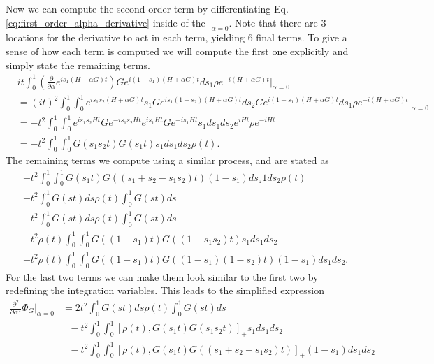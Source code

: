 \documentclass{article}
\newcommand{\parens}[1]{\left( #1 \right)}
\newcommand{\brackets}[1]{\left[ #1 \right]}
\begin{document}
Now we can compute the second order term by differentiating Eq. \eqref{eq:first_order_alpha_derivative} inside of the $\big|_{\alpha = 0}$. Note that there are 3 locations for the derivative to act in each term, yielding 6 final terms. To give a sense of how each term is computed we will compute the first one explicitly and simply state the remaining terms.
\begin{align}
    &i t\int_0^1 \parens{\frac{\partial}{\partial \alpha} e^{i s_1 (H+ \alpha G)t}} G e^{i(1-s_1)(H+\alpha G)t} ds_1 \rho e^{-i (H+\alpha G)t} \bigg|_{\alpha=0} \\
    &= (it)^2 \int_0^1 \int_0^1 e^{i s_1 s_2 (H+\alpha G)t} s_1 G e^{i s_1 (1-s_2) (H+\alpha G)t} ds_2 G e^{i(1-s_1) (H+\alpha G)t} ds_1 \rho e^{-i(H+\alpha G) t} \bigg|_{\alpha=0} \\
    &= -t^2 \int_0^1 \int_0^1 e^{i s_1 s_2 H t} G e^{-i s_1 s_2 H t} e^{i s_1 H t} G e^{-i s_1 H t} s_1 ds_1 ds_2 e^{i H t} \rho e^{-i H t} \\
    &= -t^2 \int_0^1 \int_0^1 G(s_1 s_2 t) G(s_1 t) s_1 ds_1 ds_2 \rho(t).
\end{align}
The remaining terms we compute using a similar process, and are stated as
\begin{align}
    & -t^2 \int_0^1 \int_0^1 G(s_1 t) G((s_1 + s_2 - s_1 s_2) t) (1-s_1) ds_z1 ds_2 \rho (t) \\
    & +t^2 \int_0^1 G(st) ds \rho(t) \int_0^1 G(st) ds \\
    & +t^2 \int_0^1 G(st) ds \rho(t) \int_0^1 G(st) ds \\
    & -t^2 \rho(t) \int_0^1 \int_0^1 G((1-s_1)t) G((1-s_1 s_2) t) s_1 ds_1 ds_2 \\
    & -t^2 \rho(t) \int_0^1 \int_0^1 G((1-s_1)t) G((1-s_1)(1 - s_2) t) (1-s_1) ds_1 ds_2.
\end{align}
For the last two terms we can make them look similar to the first two by redefining the integration variables. This leads to the simplified expression
\begin{align}
    \frac{\partial^2}{\partial \alpha^2} \Phi_G \bigg|_{\alpha = 0} &= 2 t^2 \int_0^1 G(st) ds \rho(t) \int_0^1 G(st) ds \\
    &\text{ } - t^2 \int_0^1 \int_0^1 \brackets{\rho(t) , G(s_1 t) G(s_1 s_2 t)}_+ s_1 ds_1 ds_2 \\
    &\text{ } - t^2 \int_0^1 \int_0^1 \brackets{ \rho(t), G(s_1 t) G((s_1 + s_2 - s_1 s_2) t) }_+ (1-s_1) ds_1 ds_2 \\
\end{align}
\end{document}
